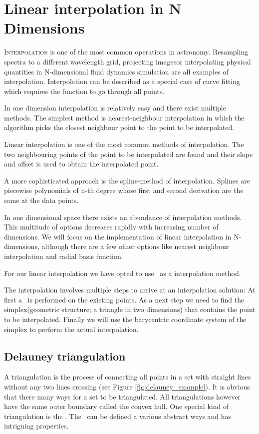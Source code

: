 \chapter{Linear interpolation in N Dimensions}
\label{chap:ndinterpolation}

\lettrine[lines=4]{I}{nterpolation} is one of the most common operations in astronomy. Resampling spectra to a different wavelength grid, projecting imagesor interpolating physical quantities in N-dimensional fluid dynamics simulation are all examples of interpolation.
Interpolation can be described as a special case of curve fitting which requires the function to go through all points. 

In one dimension interpolation is relatively easy and there exist multiple methods. The simplest method is nearest-neighbour interpolation in which the algorithm picks the closest neighbour point to the point to be interpolated. 

Linear interpolation is one of the most common methods of interpolation. The two neighbouring points of the point to be interpolated are found and their slope and offset is used to obtain the interpolated point.

A more sophisticated approach is the spline-method of interpolation. Splines are piecewise polynomials of n-th degree whose first and second derivation are the same at the data points.

In one dimensional space there exists an abundance of interpolation methods. This multitude of options decreases rapidly with increasing number of dimensions. 
We will focus on the implementation of linear interpolation in N-dimensions, although there are a few other options like nearest neighbour interpolation and radial basis function.

For our linear interpolation we have opted to use \deltri\ as a interpolation method.

The interpolation involves multiple steps to arrive at an interpolation solution: At first a \deltri\ is performed on the existing points. As a next step we need to find the simplex(geometric structure; a triangle in two dimensions) that contains the point to be interpolated. 
Finally we will use the barycentric coordinate system of the simplex to perform the actual interpolation.






\section{Delauney triangulation}
\label{sec:delauney_tri}
A triangulation is the process of connecting all points in a set with straight lines without any two lines crossing (see Figure \ref{fig:delauney_example}). It is obvious that there many ways for a set to be triangulated. All triangulations however have the same outer boundary called the convex hull. One special kind of triangulation is the \deltri. The \deltri\ can be defined a various abstract ways and has intriguing properties.


